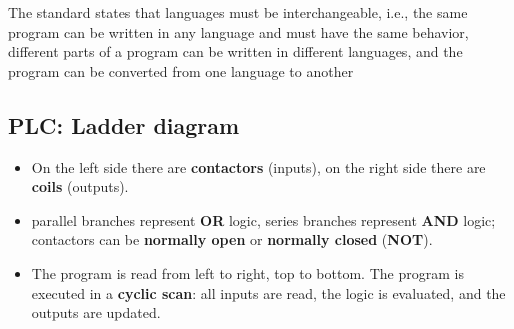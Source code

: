 \documentclass[
  letterpaper,
  DIV=11,
  numbers=noendperiod]{scrartcl}
\providecommand{\tightlist}{%
  \setlength{\itemsep}{0pt}\setlength{\parskip}{0pt}}
\begin{document}
\begin{tcolorbox}[enhanced jigsaw, arc=.35mm, bottomrule=.15mm, bottomtitle=1mm, breakable, colback=white, colbacktitle=quarto-callout-note-color!10!white, colframe=quarto-callout-note-color-frame, coltitle=black, left=2mm, leftrule=.75mm, opacityback=0, opacitybacktitle=0.6, rightrule=.15mm, title=\textcolor{quarto-callout-note-color}{\faInfo}\hspace{0.5em}{Note}, titlerule=0mm, toprule=.15mm, toptitle=1mm]

The standard states that languages must be interchangeable, i.e., the
same program can be written in any language and must have the same
behavior, different parts of a program can be written in different
languages, and the program can be converted from one language to another

\end{tcolorbox}

\subsection{PLC: Ladder diagram}\label{plc-ladder-diagram}

\begin{tcolorbox}[enhanced jigsaw, arc=.35mm, bottomrule=.15mm, bottomtitle=1mm, breakable, colback=white, colbacktitle=quarto-callout-note-color!10!white, colframe=quarto-callout-note-color-frame, coltitle=black, left=2mm, leftrule=.75mm, opacityback=0, opacitybacktitle=0.6, rightrule=.15mm, title=\textcolor{quarto-callout-note-color}{\faInfo}\hspace{0.5em}{Note}, titlerule=0mm, toprule=.15mm, toptitle=1mm]

\begin{itemize}
\tightlist
\item
  On the left side there are \textbf{contactors} (inputs), on the right
  side there are \textbf{coils} (outputs).
\item
  parallel branches represent \textbf{OR} logic, series branches
  represent \textbf{AND} logic; contactors can be \textbf{normally open}
  or \textbf{normally closed} (\textbf{NOT}).
\item
  The program is read from left to right, top to bottom. The program is
  executed in a \textbf{cyclic scan}: all inputs are read, the logic is
  evaluated, and the outputs are updated.
\end{itemize}

\end{tcolorbox}
\end{document}
